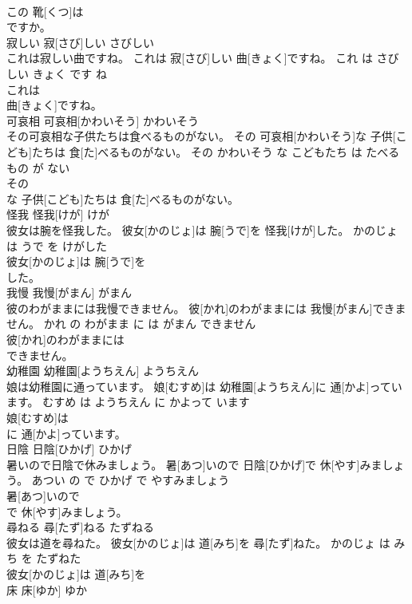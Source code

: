 \documentclass[8pt]{extreport}
\begin{document}
\begin{CJK}{UTF8}{min}
\\	この 靴[くつ]は
\\	ですか。			
\\	寂しい	寂[さび]しい	さびしい	
\\	これは寂しい曲ですね。	これは 寂[さび]しい 曲[きょく]ですね。	これ は さびしい きょく です ね	
\\	これは
\\	曲[きょく]ですね。			
\\	可哀相	可哀相[かわいそう]	かわいそう	
\\	その可哀相な子供たちは食べるものがない。	その 可哀相[かわいそう]な 子供[こども]たちは 食[た]べるものがない。	その かわいそう な こどもたち は たべる もの が ない	
\\	その
\\	な 子供[こども]たちは 食[た]べるものがない。			
\\	怪我	怪我[けが]	けが	
\\	彼女は腕を怪我した。	彼女[かのじょ]は 腕[うで]を 怪我[けが]した。	かのじょ は うで を けがした	
\\	彼女[かのじょ]は 腕[うで]を
\\	した。			
\\	我慢	我慢[がまん]	がまん	
\\	彼のわがままには我慢できません。	彼[かれ]のわがままには 我慢[がまん]できません。	かれ の わがまま に は がまん できません	
\\	彼[かれ]のわがままには
\\	できません。			
\\	幼稚園	幼稚園[ようちえん]	ようちえん	
\\	娘は幼稚園に通っています。	娘[むすめ]は 幼稚園[ようちえん]に 通[かよ]っています。	むすめ は ようちえん に かよって います	
\\	娘[むすめ]は
\\	に 通[かよ]っています。			
\\	日陰	日陰[ひかげ]	ひかげ	
\\	暑いので日陰で休みましょう。	暑[あつ]いので 日陰[ひかげ]で 休[やす]みましょう。	あつい の で ひかげ で やすみましょう	
\\	暑[あつ]いので
\\	で 休[やす]みましょう。			
\\	尋ねる	尋[たず]ねる	たずねる	
\\	彼女は道を尋ねた。	彼女[かのじょ]は 道[みち]を 尋[たず]ねた。	かのじょ は みち を たずねた	
\\	彼女[かのじょ]は 道[みち]を
\\	床	床[ゆか]	ゆか	

\end{CJK}
\end{document}
